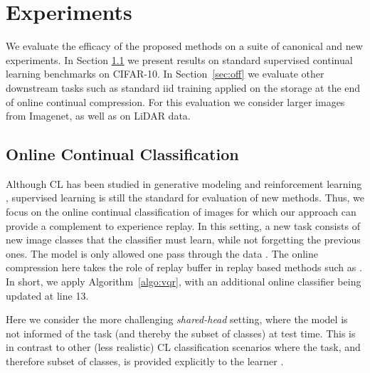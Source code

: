 \documentclass[colorinlistoftodos]{article} %
\begin{document}
\section{Experiments}

We evaluate the efficacy of the proposed methods on a suite of canonical and new experiments. In  Section \ref{sec:can_cl} we present results on standard supervised continual learning benchmarks on CIFAR-10. In Section~\ref{sec:off} we evaluate other downstream tasks such as standard iid training applied on the storage at the end of online continual compression. For this evaluation we consider larger images from Imagenet, as well as on LiDAR data.  

\subsection{Online Continual Classification}
\label{sec:can_cl}
Although CL has been studied in generative modeling \citep{ramapuram2017lifelong,lesort2018generative,Zhai2019LifelongGC,lesort2019marginal} and reinforcement learning \citep{kirkpatrick2017overcoming,fernando2017pathnet,riemer2018learning}, supervised learning is still the standard for evaluation of new methods. Thus, we focus on the online continual classification of images for which our approach can provide a complement to experience replay. In this setting, a new task consists of new image classes that the classifier must learn, while not forgetting the previous ones. The model is only allowed one pass through the data \citep{lopez2017gradient,chaudhry2018efficient,aljundi2019online,chaudhry2019continual}. The online compression here takes the role of replay buffer in replay based methods such as \cite{chaudhry2019continual,aljundi2019online}. In short, we apply Algorithm~\ref{algo:vqr}, with an additional online classifier being updated at line 13.

Here we consider the more challenging \textit{shared-head} setting, where the model is not informed of the task (and thereby the subset of classes) at test time. This is in contrast to other (less realistic) CL classification scenarios where the task, and therefore subset of classes, is provided explicitly to the learner \cite{farquhar2018towards}.
\end{document}
